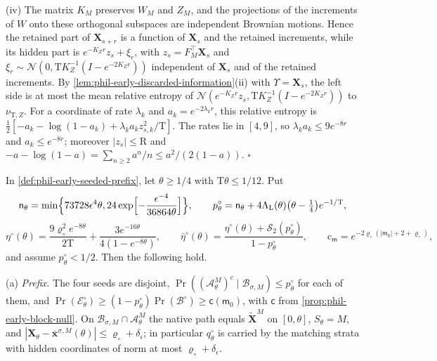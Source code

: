 (iv) The matrix \(K_M\) preserves \(W_M\) and \(Z_M\), and the projections of
the increments of \(W\) onto these orthogonal subspaces are independent
Brownian motions. Hence the retained part of
\(\widehat{\mathbf X}_{s+r}\) is a function of \(\mathbf X_s\) and the
retained increments, while its hidden part is
\(e^{-K_Zr}z_s+\xi_r\), with \(z_s=F_M^\top\mathbf X_s\) and
\(\xi_r\sim\mathcal N(0,\mathrm TK_Z^{-1}(I-e^{-2K_Zr}))\) independent of
\(\mathbf X_s\) and of the retained increments. By
\cref{lem:phil-early-discarded-information}(ii) with \(\Upsilon=\mathbf X_s\), the
left side is at most the mean relative entropy of
\(\mathcal N(e^{-K_Zr}z_s,\mathrm TK_Z^{-1}(I-e^{-2K_Zr}))\) to
\(\nu_{\mathrm T,Z}\). For a coordinate of rate \(\lambda_k\) and
\(a_k=e^{-2\lambda_kr}\), this relative entropy is
\(\frac12[-a_k-\log(1-a_k)+\lambda_ka_kz_{s,k}^2/\mathrm T]\). The rates lie
in \([4,9]\), so \(\lambda_ka_k\le9e^{-8r}\) and \(a_k\le e^{-8r}\); moreover
\(|z_s|\le\mathrm R\) and \(-a-\log(1-a)=\sum_{n\ge2}a^n/n\le a^2/(2(1-a))\).
\(\square\)

In \cref{def:phil-early-seeded-prefix}, let \(\theta\ge1/4\) with
\(\mathrm T\theta\le1/12\). Put
\[
 \mathsf n_\theta=\min\Bigl\{73728\epsilon^4\theta,
   24\exp\Bigl[-\frac{\epsilon^{-4}}{36864\theta}\Bigr]\Bigr\},\qquad
 p^\circ_\theta=\mathsf n_\theta
   +4\Lambda_{\mathrm L}(\theta)\bigl(\theta-\tfrac14\bigr)e^{-1/\mathrm T},
\]
\[
 \eta^\circ(\theta)=\frac{9\varrho_\circ^2e^{-8\theta}}{2\mathrm T}
   +\frac{3e^{-16\theta}}{4(1-e^{-8\theta})},\qquad
 \bar\eta^\circ(\theta)
   =\frac{\eta^\circ(\theta)+\mathcal S_2(p^\circ_\theta)}{1-p^\circ_\theta},
 \qquad
 \mathrm c_{\mathsf m}=e^{-2\varrho_\circ(|\mathsf m_0|+2+\varrho_\circ)},
\]
and assume \(p^\circ_\theta<1/2\). Then the following hold.

(a) \emph{Prefix.} The four seeds are disjoint,
\(\Pr((\mathscr A^M_\theta)^c\mid\mathscr B_{\sigma,M})\le p^\circ_\theta\)
for each of them, and
\(\Pr(\mathscr E^\circ_\theta)\ge(1-p^\circ_\theta)\Pr(\mathscr B^\circ)
\ge\mathsf c(\mathsf m_0)\), with \(\mathsf c\) from
\cref{prop:phil-early-block-null}. On
\(\mathscr B_{\sigma,M}\cap\mathscr A^M_\theta\) the native path equals
\(\widetilde{\mathbf X}^M\) on \([0,\theta]\), \(S_\theta=M\), and
\(|\mathbf X_\theta-\bar{\mathbf x}^{\sigma,M}(\theta)|\le\varrho_\circ+\delta_\epsilon\);
in particular \(q^\circ_\theta\) is carried by the matching strata with hidden
coordinates of norm at most \(\varrho_\circ+\delta_\epsilon\).

